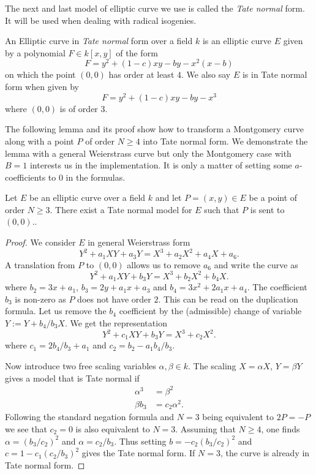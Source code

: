 \documentclass[../main/main.tex]{subfiles}
\begin{document}
The next and last model of elliptic curve we use is called the \textit{Tate normal} form.
It will be used when dealing with radical isogenies.
\begin{definition}
	An Elliptic curve in \textit{Tate normal} form over a field $k$ is an elliptic curve $E$ given by a polynomial $F\in k[x, y]$ of the form
	\[
		F = y^2 + (1-c)xy - by - x^2(x-b)
	\]
	on which the point $(0,0)$ has order at least $4$.
	We also say $E$ is in Tate normal form when given by
	\[
		F = y^2 + (1-c)xy - by - x^3
	\]
	where $(0,0)$ is of order $3$.
\end{definition}
The following lemma and its proof show how to transform a Montgomery curve along with a point $P$ of order $N\geq 4$ into Tate normal form.
We demonstrate the lemma with a general Weierstrass curve but only the Montgomery case with $B=1$ interests us in the implementation.
It is only a matter of setting some $a$-coefficients to $0$ in the formulas.
\begin{lemma}
	Let $E$ be an elliptic curve over a field $k$ and let $P=(x, y)\in E$ be a point of order $N\geq 3$.
	There exist a Tate normal model for $E$ such that $P$ is sent to $(0,0)$..
\end{lemma}
\begin{proof}
	We consider $E$ in general Weierstrass form
	\[
		Y^2 + a_1XY + a_3Y = X^3 +a_2 X^2 + a_4 X + a_6.
	\]
	A translation from $P$ to $(0, 0)$ allows us to remove $a_6$ and write the curve as
	\[
		Y^2 + a_1XY + b_3Y = X^3 +b_2 X^2 + b_4 X.
	\]
	where $b_2 = 3x+a_1$, $b_3 = 2y + a_1x + a_3$ and $b_4 = 3x^2 +2a_1x+a_4$.
	The coefficient $b_3$ is non-zero as $P$ does not have order $2$.
	This can be read on the duplication formula.
	Let us remove the $b_4$ coefficient by the (admissible) change of variable $Y :=Y + b_4 /b_3  X$.
	We get the representation
	\[
		Y^2 + c_1XY + b_3Y = X^3 +c_2 X^2.
	\]
	where  $c_1 = 2 b_4 / b_3 + a_1$ and $c_2 = b_2 - a_1b_4/b_3$.

	Now introduce two free scaling variables $\alpha, \beta\in k$.
	The scaling $X = \alpha X$, $Y = \beta Y$ gives a model that is Tate normal if
	\begin{align*}
		{\alpha}^3 &= 	{\beta}^2 \\
		\beta b_3 &= c_2 {\alpha}^2.
	\end{align*}
	Following the standard negation formula and $N=3$ being equivalent to $2P = -P$ we see that $c_2 = 0$ is also equivalent to $N=3$.
	Assuming that $N\geq 4$, one finds $\alpha = ({b_3}/c_2)^2$ and $\alpha = c_2/b_3$.
	Thus setting $b = -c_2(b_3/c_2)^2$ and $c = 1-c_1(c_2/b_3)^2$ gives the Tate normal form.
	If  $N=3$, the curve is already in Tate normal form.
\end{proof}
\end{document}
